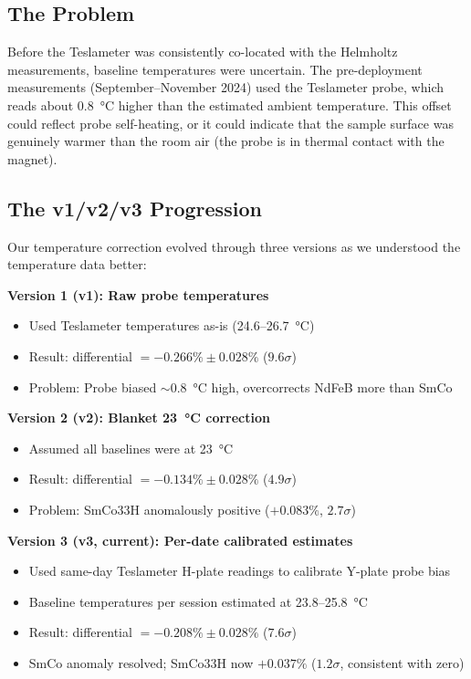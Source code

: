 \documentclass[11pt,letterpaper]{article}
\begin{document}
\subsection{The Problem}

Before the Teslameter was consistently co-located with the Helmholtz
measurements, baseline temperatures were uncertain. The pre-deployment
measurements (September--November 2024) used the Teslameter probe, which reads
about \SI{0.8}{\degreeCelsius} higher than the estimated ambient temperature.
This offset could reflect probe self-heating, or it could indicate that the
sample surface was genuinely warmer than the room air (the probe is in thermal
contact with the magnet).

\subsection{The v1/v2/v3 Progression}

Our temperature correction evolved through three versions as we understood the
temperature data better:

\textbf{Version 1 (v1): Raw probe temperatures}
\begin{itemize}[nosep]
  \item Used Teslameter temperatures as-is (24.6--\SI{26.7}{\degreeCelsius})
  \item Result: differential $= -0.266\% \pm 0.028\%$ ($9.6\sigma$)
  \item Problem: Probe biased ${\sim}$\SI{0.8}{\degreeCelsius} high, overcorrects NdFeB more than SmCo
\end{itemize}

\textbf{Version 2 (v2): Blanket \SI{23}{\degreeCelsius} correction}
\begin{itemize}[nosep]
  \item Assumed all baselines were at \SI{23}{\degreeCelsius}
  \item Result: differential $= -0.134\% \pm 0.028\%$ ($4.9\sigma$)
  \item Problem: SmCo33H anomalously positive ($+0.083\%$, $2.7\sigma$)
\end{itemize}

\textbf{Version 3 (v3, current): Per-date calibrated estimates}
\begin{itemize}[nosep]
  \item Used same-day Teslameter H-plate readings to calibrate Y-plate probe bias
  \item Baseline temperatures per session estimated at 23.8--\SI{25.8}{\degreeCelsius}
  \item Result: differential $= -0.208\% \pm 0.028\%$ ($7.6\sigma$)
  \item SmCo anomaly resolved; SmCo33H now $+0.037\%$ ($1.2\sigma$, consistent with zero)
\end{itemize}
\end{document}
